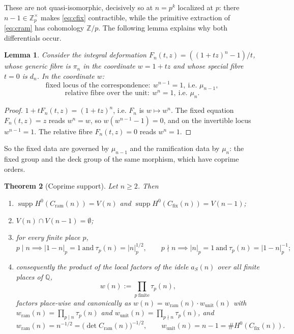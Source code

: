 \documentclass[11pt]{amsart}
\newtheorem{theorem}{Theorem}[section]
\newtheorem{lemma}[theorem]{Lemma}
\theoremstyle{definition}
\theoremstyle{remark}
\newcommand{\Z}{\mathbb Z}
\newcommand{\Q}{\mathbb Q}
\newcommand{\supp}{\operatorname{supp}}
\begin{document}
These are not quasi-isomorphic, decisively so at $n=p^k$ localized at $p$:
there $n-1\in\Z_p^\times$ makes \eqref{eq:cfix} contractible, while the
primitive extraction of \eqref{eq:cram} has cohomology $\Z/p$.  The following
lemma explains why both differentials occur.

\begin{lemma}\label{lem:deformation}
Consider the integral deformation $F_n(t,z)=((1+tz)^n-1)/t$, whose generic
fibre is $\pi_n$ in the coordinate $w=1+tz$ and whose special fibre $t=0$ is
$d_n$. In the coordinate $w$:
\[
  \text{fixed locus of the correspondence}:\ w^{n-1}=1,\ \text{i.e. }\mu_{n-1},
\]
\[
  \text{relative fibre over the unit}:\ w^n=1,\ \text{i.e. }\mu_n .
\]
\end{lemma}

\begin{proof}
$1+tF_n(t,z)=(1+tz)^n$, i.e. $F_n$ is $w\mapsto w^n$. The fixed equation
$F_n(t,z)=z$ reads $w^n=w$, so $w(w^{n-1}-1)=0$, and on the invertible locus
$w^{n-1}=1$. The relative fibre $F_n(t,z)=0$ reads $w^n=1$.
\end{proof}

So the fixed data are governed by $\mu_{n-1}$ and the ramification data by
$\mu_n$: the fixed group and the deck group of the same morphism, which have
coprime orders.

\begin{theorem}[Coprime support]\label{thm:separation}
Let $n\ge2$. Then
\begin{enumerate}
\item[(i)] $\supp H^0(C_{\mathrm{ram}}(n))=V(n)$ and
$\supp H^0(C_{\mathrm{fix}}(n))=V(n-1)$;
\item[(ii)] $V(n)\cap V(n-1)=\emptyset$;
\item[(iii)] for every finite place $p$,
\[
  p\mid n\implies|1-n|_p=1\ \text{and}\ \tau_p(n)=|n|_p^{1/2},\qquad
  p\nmid n\implies|n|_p=1\ \text{and}\ \tau_p(n)=|1-n|_p^{-1};
\]
\item[(iv)] consequently the product of the local factors of the idele
$a_S(n)$ over all finite places of $\Q$,
\[
  w(n):=\prod_{p\ \mathrm{finite}}\tau_p(n),
\]
factors place-wise and canonically as $w(n)=w_{\mathrm{ram}}(n)\cdot
w_{\mathrm{unit}}(n)$ with $w_{\mathrm{ram}}(n)=\prod_{p\mid n}\tau_p(n)$ and
$w_{\mathrm{unit}}(n)=\prod_{p\nmid n}\tau_p(n)$, and
\begin{equation}\label{eq:wramunit}
  w_{\mathrm{ram}}(n)=n^{-1/2}=\bigl(\det C_{\mathrm{ram}}(n)\bigr)^{-1/2},
  \qquad
  w_{\mathrm{unit}}(n)=n-1=\#H^0(C_{\mathrm{fix}}(n)).
\end{equation}
\end{enumerate}
\end{theorem}
\end{document}
